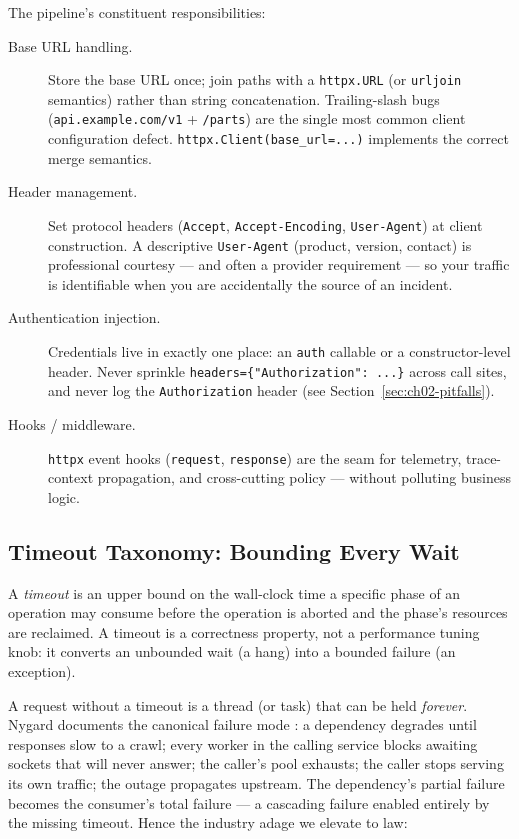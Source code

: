 The pipeline's constituent responsibilities:

\begin{description}
  \item[Base URL handling.] Store the base URL once; join paths with a
        \texttt{httpx.URL} (or \texttt{urljoin} semantics) rather than string
        concatenation. Trailing-slash bugs (\texttt{api.example.com/v1} +
        \texttt{/parts}) are the single most common client configuration
        defect. \texttt{httpx.Client(base\_url=...)} implements the correct
        merge semantics.
  \item[Header management.] Set protocol headers (\texttt{Accept},
        \texttt{Accept-Encoding}, \texttt{User-Agent}) at client construction.
        A descriptive \texttt{User-Agent} (product, version, contact) is
        professional courtesy --- and often a provider requirement --- so
        your traffic is identifiable when you are accidentally the source of
        an incident.
  \item[Authentication injection.] Credentials live in exactly one place: an
        \texttt{auth} callable or a constructor-level header. Never sprinkle
        \texttt{headers=\{"Authorization": ...\}} across call sites, and
        never log the \texttt{Authorization} header (see
        Section~\ref{sec:ch02-pitfalls}).
  \item[Hooks / middleware.] \texttt{httpx} event hooks
        (\texttt{request}, \texttt{response}) are the seam for telemetry,
        trace-context propagation, and cross-cutting policy --- without
        polluting business logic.
\end{description}

\subsection{Timeout Taxonomy: Bounding Every Wait}
\label{sec:ch02-timeouts}

\begin{definition}[Timeout]
A \emph{timeout} is an upper bound on the wall-clock time a specific phase of
an operation may consume before the operation is aborted and the phase's
resources are reclaimed. A timeout is a correctness property, not a
performance tuning knob: it converts an unbounded wait (a hang) into a bounded
failure (an exception).
\end{definition}

A request without a timeout is a thread (or task) that can be held
\emph{forever}. Nygard documents the canonical failure mode
\cite{nygard2018releaseit}: a dependency degrades until responses slow to a
crawl; every worker in the calling service blocks awaiting sockets that will
never answer; the caller's pool exhausts; the caller stops serving its own
traffic; the outage propagates upstream. The dependency's partial failure
becomes the consumer's total failure --- a cascading failure enabled entirely
by the missing timeout. Hence the industry adage we elevate to law:

